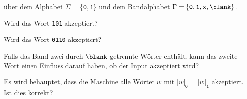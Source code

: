über dem Alphabet
$\Sigma = \{\texttt{0},\texttt{1}\}$
und dem Bandalphabet
$\Gamma = \{\texttt{0},\texttt{1},\texttt{x},\blank\}$.

\begin{teilaufgaben}
\item Wird das Wort \texttt{101} akzeptiert?
\item Wird das Wort \texttt{0110} akzeptiert?
\item Falls das Band zwei durch $\blank$ getrennte Wörter enthält,
kann das zweite Wort einen Einfluss darauf haben, ob der Input akzeptiert
wird?
\item
Es wird behauptet, dass die Maschine alle Wörter
$w$ mit $|w|_{\texttt{0}}=|w|_{\texttt{1}}$
akzeptiert.
Ist dies korrekt?
\end{teilaufgaben}


